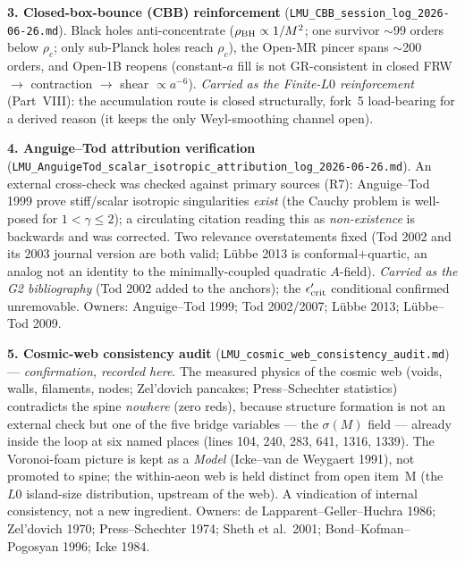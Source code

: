 \documentclass[11pt]{article}
\begin{document}
\smallskip\noindent\textbf{3. Closed-box-bounce (CBB) reinforcement} (\texttt{LMU\_CBB\_session\_log\_2026-06-26.md}). Black holes anti-concentrate ($\rho_{\rm BH}\propto1/M^2$; one survivor $\sim$99 orders below $\rho_c$; only sub-Planck holes reach $\rho_c$), the Open-MR pincer spans $\sim$200 orders, and Open-1B reopens (constant-$a$ fill is not GR-consistent in closed FRW $\to$ contraction $\to$ shear $\propto a^{-6}$). \emph{Carried as the Finite-$L0$ reinforcement} (Part~VIII): the accumulation route is closed structurally, fork~5 load-bearing for a derived reason (it keeps the only Weyl-smoothing channel open).

\smallskip\noindent\textbf{4. Anguige--Tod attribution verification} (\texttt{LMU\_AnguigeTod\_scalar\_isotropic\_attribution\_log\_2026-06-26.md}). An external cross-check was checked against primary sources (R7): Anguige--Tod 1999 prove stiff/scalar isotropic singularities \emph{exist} (the Cauchy problem is well-posed for $1<\gamma\le2$); a circulating citation reading this as \emph{non-existence} is backwards and was corrected. Two relevance overstatements fixed (Tod 2002 and its 2003 journal version are both valid; Lübbe 2013 is conformal$+$quartic, an analog not an identity to the minimally-coupled quadratic $A$-field). \emph{Carried as the G2 bibliography} (Tod 2002 added to the anchors); the $\epsilon'_{\rm crit}$ conditional confirmed unremovable. Owners: Anguige--Tod 1999; Tod 2002/2007; Lübbe 2013; Lübbe--Tod 2009.

\smallskip\noindent\textbf{5. Cosmic-web consistency audit} (\texttt{LMU\_cosmic\_web\_consistency\_audit.md}) --- \emph{confirmation, recorded here}. The measured physics of the cosmic web (voids, walls, filaments, nodes; Zel'dovich pancakes; Press--Schechter statistics) contradicts the spine \emph{nowhere} (zero reds), because structure formation is not an external check but one of the five bridge variables --- the $\sigma(M)$ field --- already inside the loop at six named places (lines 104, 240, 283, 641, 1316, 1339). The Voronoi-foam picture is kept as a \emph{Model} (Icke--van de Weygaert 1991), not promoted to spine; the within-aeon web is held distinct from open item~M (the $L0$ island-size distribution, upstream of the web). A vindication of internal consistency, not a new ingredient. Owners: de Lapparent--Geller--Huchra 1986; Zel'dovich 1970; Press--Schechter 1974; Sheth et al.\ 2001; Bond--Kofman--Pogosyan 1996; Icke 1984.
\end{document}
